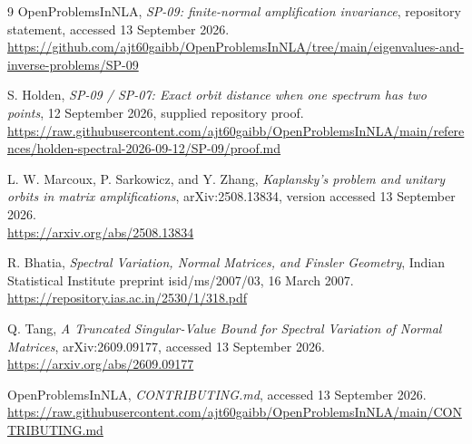 \documentclass[11pt]{article}
\theoremstyle{definition}\newtheorem{definition}[theorem]{Definition}
\theoremstyle{remark}\newtheorem{remark}[theorem]{Remark}
\begin{document}
\clearpage
\begin{thebibliography}{9}
OpenProblemsInNLA, \emph{SP-09: finite-normal amplification invariance}, repository statement, accessed 13 September 2026.\\
\url{https://github.com/ajt60gaibb/OpenProblemsInNLA/tree/main/eigenvalues-and-inverse-problems/SP-09}

S. Holden, \emph{SP-09 / SP-07: Exact orbit distance when one spectrum has two points}, 12 September 2026, supplied repository proof.\\
\url{https://raw.githubusercontent.com/ajt60gaibb/OpenProblemsInNLA/main/references/holden-spectral-2026-09-12/SP-09/proof.md}

L. W. Marcoux, P. Sarkowicz, and Y. Zhang, \emph{Kaplansky's problem and unitary orbits in matrix amplifications}, arXiv:2508.13834, version accessed 13 September 2026.\\
\url{https://arxiv.org/abs/2508.13834}

R. Bhatia, \emph{Spectral Variation, Normal Matrices, and Finsler Geometry}, Indian Statistical Institute preprint isid/ms/2007/03, 16 March 2007.\\
\url{https://repository.ias.ac.in/2530/1/318.pdf}

Q. Tang, \emph{A Truncated Singular-Value Bound for Spectral Variation of Normal Matrices}, arXiv:2609.09177, accessed 13 September 2026.\\
\url{https://arxiv.org/abs/2609.09177}

OpenProblemsInNLA, \emph{CONTRIBUTING.md}, accessed 13 September 2026.\\
\url{https://raw.githubusercontent.com/ajt60gaibb/OpenProblemsInNLA/main/CONTRIBUTING.md}
\end{thebibliography}
\end{document}
